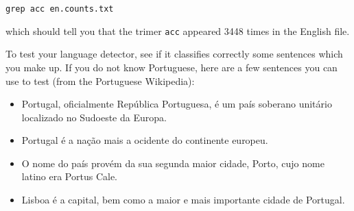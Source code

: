 \begin{verbatim}
grep acc en.counts.txt
\end{verbatim}

which should tell you that the trimer \texttt{acc} appeared 3448 times in the English file.

To test your language detector, see if it classifies correctly some sentences which you make up. If you do not know Portuguese, here are a few sentences you can use to test (from the Portuguese Wikipedia):

\begin{itemize}
\item Portugal, oficialmente Rep\'ublica Portuguesa, \'e um pa\'is soberano unit\'ario localizado no Sudoeste da Europa.
\item Portugal \'e a na\c{c}\~ao mais a ocidente do continente europeu.
\item O nome do pa\'is prov\'em da sua segunda maior cidade, Porto, cujo nome latino era Portus Cale.
\item Lisboa \'e a capital, bem como a maior e mais importante cidade de Portugal.
\end{itemize}

%
%
%
%
%
%
%


